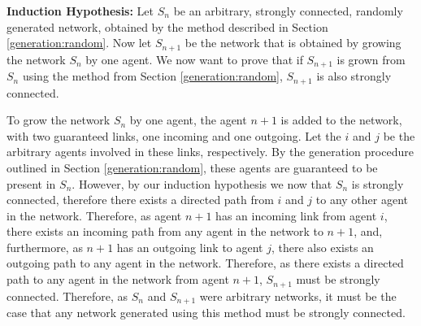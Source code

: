 \documentclass[a4paper, 12pt]{report}
\begin{document}
\textbf{Induction Hypothesis:}\newline
Let $S_n$ be an arbitrary, strongly connected, randomly generated network, obtained by the method described in Section \ref{generation:random}. Now let $S_{n+1}$ be the network that is obtained by growing the network $S_n$ by one agent. We now want to prove that if $S_{n+1}$ is grown from $S_n$ using the method from Section \ref{generation:random}, $S_{n+1}$ is also strongly connected.\newline

To grow the network $S_n$ by one agent, the agent $n+1$ is added to the network, with two guaranteed links, one incoming and one outgoing. Let the $i$ and $j$ be the arbitrary agents involved in these links, respectively. By the generation procedure outlined in Section \ref{generation:random}, these agents are guaranteed to be present in $S_n$. However, by our induction hypothesis we now that $S_n$ is strongly connected, therefore there exists a directed path from $i$ and $j$ to any other agent in the network. Therefore, as agent $n+1$ has an incoming link from agent $i$, there exists an incoming path from any agent in the network to $n+1$, and, furthermore, as $n+1$ has an outgoing link to agent $j$, there also exists an outgoing path to any agent in the network. Therefore, as there exists a directed path to any agent in the network from agent $n+1$, $S_{n+1}$ must be strongly connected.\newline
Therefore, as $S_n$ and $S_{n+1}$ were arbitrary networks, it must be the case that any network generated using this method must be strongly connected.\newline
\end{document}
